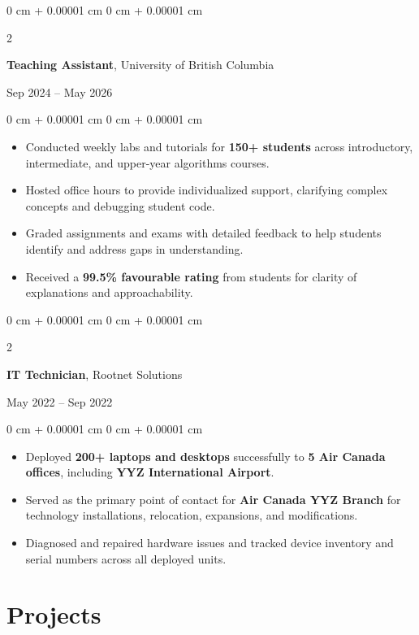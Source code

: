 \documentclass[9pt, letterpaper]{extarticle}
\newenvironment{highlights}{
    \begin{itemize}[
        topsep=0.10 cm,
        parsep=0.10 cm,
        partopsep=0pt,
        itemsep=0pt,
        leftmargin=0 cm + 10pt
    ]
}{
    \end{itemize}
} %
\newenvironment{onecolentry}{
    \begin{adjustwidth}{
        0 cm + 0.00001 cm
    }{
        0 cm + 0.00001 cm
    }
}{
    \end{adjustwidth}
} %
\newenvironment{twocolentry}[2][]{
    \onecolentry
    \def\secondColumn{#2}
    \setcolumnwidth{\fill, 4.5 cm}
    \begin{paracol}{2}
}{
    \switchcolumn \raggedleft \secondColumn
    \end{paracol}
    \endonecolentry
} %
\begin{document}
        \vspace{0.2 cm}
    \begin{twocolentry}{Sep 2024 – May 2026}
        \textbf{Teaching Assistant}, University of British Columbia
    \end{twocolentry}
    \vspace{0.10 cm}
    \begin{onecolentry}
        \begin{highlights}
            \item Conducted weekly labs and tutorials for \textbf{150+ students} across introductory, intermediate, and upper-year algorithms courses.
            \item Hosted office hours to provide individualized support, clarifying complex concepts and debugging student code.
            \item Graded assignments and exams with detailed feedback to help students identify and address gaps in understanding.
            \item Received a \textbf{99.5\% favourable rating} from students for clarity of explanations and approachability.
        \end{highlights}
    \end{onecolentry}
    \vspace{0.2 cm}
    \begin{twocolentry}{May 2022 – Sep 2022}
        \textbf{IT Technician}, Rootnet Solutions
    \end{twocolentry}
    \vspace{0.10 cm}
    \begin{onecolentry}
        \begin{highlights}
            \item Deployed \textbf{200+ laptops and desktops} successfully to \textbf{5 Air Canada offices}, including \textbf{YYZ International Airport}.
            \item Served as the primary point of contact for \textbf{Air Canada YYZ Branch} for technology installations, relocation, expansions, and modifications.
            \item Diagnosed and repaired hardware issues and tracked device inventory and serial numbers across all deployed units.
        \end{highlights}
    \end{onecolentry}

    
    \section{Projects}
\end{document}
